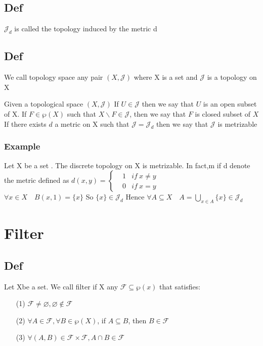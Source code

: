 \documentclass{book}
\begin{document}
\section{Def}
$\mathcal{J} _d$ is called the topology induced by the metric d
\section{Def}
We call topology space any pair $(X,\mathcal{J})$ where X is a set and $\mathcal{J}$ is a topology on X

Given a topological space $(X,\mathcal{J})$ If $U\in \mathcal{J}$ then we say that $U$ is an open subset of X. If $F\in \wp(X)$ such that $X\backslash F\in \mathcal{J}$, then we say that $F$ is closed subset of $X$\\
If there exists $d$ a metric on X such that $\mathcal{J}=\mathcal{J}_d$ then we say that $\mathcal{J}$ is metrizable
\subsection{Example}
Let X be a set . The discrete topology on X is metrizable. In fact,m if d denote the metric defined as $d(x,y)=\left\{\begin{aligned}
    &1 & if\ x\not=y\\
    &0 & if\ x=y
    \end{aligned}\right.$\\
$\forall x\in X\quad B(x,1)=\{x\}$ So $\{x\}\in \mathcal{J}_d$ Hence $\forall A\subseteq X\quad A=\bigcup\limits_{x\in A}\{x\}\in \mathcal{J}_d$ 
\chapter{Filter}
\section{Def}
Let Xbe a set. We call filter if X any $\mathcal{F}\subseteq \wp(x)$ that satisfies:
\begin{itemize}
    \item [(1)]$\mathcal{F}\not=\varnothing,\varnothing\not\in \mathcal{F}$
    \item [(2)]$\forall A\in\mathcal{F},\forall B\in \wp(X)$, if $A\subseteq B$, then $B\in \mathcal{F}$
    \item [(3)]$\forall (A,B)\in \mathcal{F}\times\mathcal{F},A\cap B\in \mathcal{F}$
\end{itemize}
\end{document}
